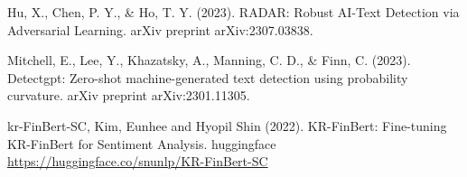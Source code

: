 \documentclass{article}
\begin{document}
Hu, X., Chen, P. Y., \& Ho, T. Y. (2023). RADAR: Robust AI-Text Detection via Adversarial Learning. arXiv preprint arXiv:2307.03838.

Mitchell, E., Lee, Y., Khazatsky, A., Manning, C. D., \& Finn, C. (2023). Detectgpt: Zero-shot machine-generated text detection using probability curvature. arXiv preprint arXiv:2301.11305.

kr-FinBert-SC, Kim, Eunhee and Hyopil Shin (2022). KR-FinBert: Fine-tuning KR-FinBert for Sentiment Analysis. huggingface \url{https://huggingface.co/snunlp/KR-FinBert-SC}
\end{document}

